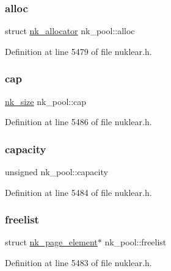\subsubsection{\texorpdfstring{alloc}{alloc}}
{\footnotesize\ttfamily struct \mbox{\hyperlink{structnk__allocator}{nk\+\_\+allocator}} nk\+\_\+pool\+::alloc}



Definition at line 5479 of file nuklear.\+h.

\mbox{\label{structnk__pool_a7eb35ea500f4832024688285f1394df0}} 
\subsubsection{\texorpdfstring{cap}{cap}}
{\footnotesize\ttfamily \mbox{\hyperlink{nuklear_8h_a84c0fc50dec5501be327b33d41d9010c}{nk\+\_\+size}} nk\+\_\+pool\+::cap}



Definition at line 5486 of file nuklear.\+h.

\mbox{\label{structnk__pool_ad65a0bf770d9244c15d76669082249a1}} 
\subsubsection{\texorpdfstring{capacity}{capacity}}
{\footnotesize\ttfamily unsigned nk\+\_\+pool\+::capacity}



Definition at line 5484 of file nuklear.\+h.

\mbox{\label{structnk__pool_a63aca14faed2e7d08a74d7bc3bd06872}} 
\subsubsection{\texorpdfstring{freelist}{freelist}}
{\footnotesize\ttfamily struct \mbox{\hyperlink{structnk__page__element}{nk\+\_\+page\+\_\+element}}$\ast$ nk\+\_\+pool\+::freelist}



Definition at line 5483 of file nuklear.\+h.

